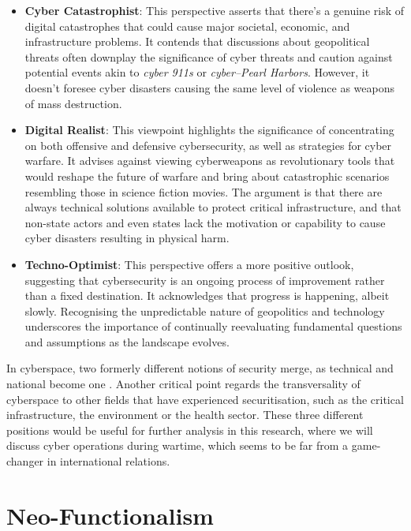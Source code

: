 \begin{itemize}
    \item \textbf{Cyber Catastrophist}: This perspective asserts that there's a genuine risk of digital catastrophes that could cause major societal, economic, and infrastructure problems. It contends that discussions about geopolitical threats often downplay the significance of cyber threats and caution against potential events akin to \textit{cyber 911s} or \textit{cyber–Pearl Harbors}. However, it doesn't foresee cyber disasters causing the same level of violence as weapons of mass destruction.
    \item \textbf{Digital Realist}: This viewpoint highlights the significance of concentrating on both offensive and defensive cybersecurity, as well as strategies for cyber warfare. It advises against viewing cyberweapons as revolutionary tools that would reshape the future of warfare and bring about catastrophic scenarios resembling those in science fiction movies. The argument is that there are always technical solutions available to protect critical infrastructure, and that non-state actors and even states lack the motivation or capability to cause cyber disasters resulting in physical harm.
    \item \textbf{Techno-Optimist}: This perspective offers a more positive outlook, suggesting that cybersecurity is an ongoing process of improvement rather than a fixed destination. It acknowledges that progress is happening, albeit slowly. Recognising the unpredictable nature of geopolitics and technology underscores the importance of continually reevaluating fundamental questions and assumptions as the landscape evolves.
\end{itemize}

In cyberspace, two formerly different notions of security merge, as technical and national become one \autocite{balzacq_2016_securitization}. Another critical point regards the transversality of cyberspace to other fields that have experienced securitisation, such as the critical infrastructure, the environment or the health sector.  These three different positions would be useful for further analysis in this research, where we will discuss cyber operations during wartime, which seems to be far from a game-changer in international relations. 

\section{Neo-Functionalism}

